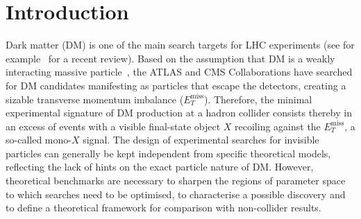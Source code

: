 \documentclass[a4paper, 11pt,notoc]{article}
\newcommand{\MET}{\ensuremath{E_T^\mathrm{miss}}\xspace}
\begin{document}
\maketitle


\section{Introduction}
\label{sec:introduction}

Dark matter (DM) is one of the main search targets for LHC experiments (see for example~\cite{Kahlhoefer:2017dnp} for a recent review). Based on the assumption that DM is a weakly interacting massive particle~\cite{Bertone:2004pz}, the ATLAS and CMS Collaborations have searched for DM candidates manifesting as particles that escape the detectors, creating a sizable transverse momentum imbalance ($\MET$). Therefore, the minimal experimental signature of DM production at a hadron collider consists thereby in an excess of events with a visible final-state object $X$ recoiling against the $\MET$, a so-called mono-$X$ signal.  The design of experimental searches for invisible particles can generally be kept independent from specific theoretical models, reflecting the lack of hints on the exact particle nature of DM. However, theoretical benchmarks are necessary to sharpen the regions of parameter space to which searches need to be optimised, to characterise a possible discovery and to define a theoretical framework for comparison with non-collider results. 
\end{document}
